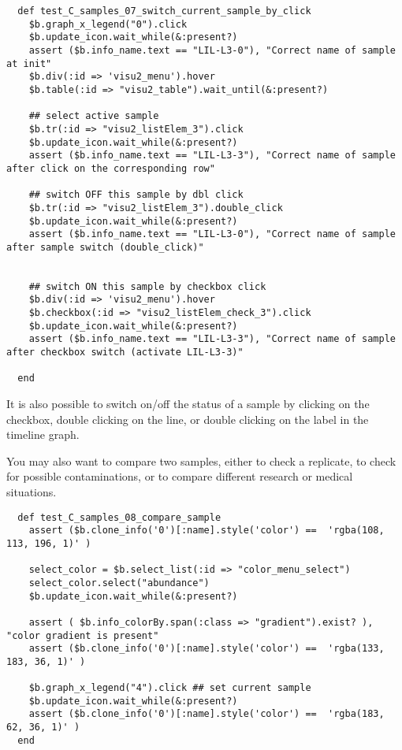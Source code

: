 \begin{verbatim}
  def test_C_samples_07_switch_current_sample_by_click
    $b.graph_x_legend("0").click
    $b.update_icon.wait_while(&:present?)
    assert ($b.info_name.text == "LIL-L3-0"), "Correct name of sample at init"
    $b.div(:id => 'visu2_menu').hover
    $b.table(:id => "visu2_table").wait_until(&:present?)

    ## select active sample
    $b.tr(:id => "visu2_listElem_3").click
    $b.update_icon.wait_while(&:present?)
    assert ($b.info_name.text == "LIL-L3-3"), "Correct name of sample after click on the corresponding row"

    ## switch OFF this sample by dbl click
    $b.tr(:id => "visu2_listElem_3").double_click
    $b.update_icon.wait_while(&:present?)
    assert ($b.info_name.text == "LIL-L3-0"), "Correct name of sample after sample switch (double_click)"
    

    ## switch ON this sample by checkbox click
    $b.div(:id => 'visu2_menu').hover
    $b.checkbox(:id => "visu2_listElem_check_3").click
    $b.update_icon.wait_while(&:present?)
    assert ($b.info_name.text == "LIL-L3-3"), "Correct name of sample after checkbox switch (activate LIL-L3-3)"
    
  end
\end{verbatim}
It is also possible to switch on/off the status of a sample by clicking on the checkbox, double clicking on the line, or double clicking on the label in the timeline graph.

\bigskip

You may also want to compare two samples, either to check a replicate, to check for possible contaminations, or to
compare different research or medical situations.

\begin{verbatim}
  def test_C_samples_08_compare_sample
    assert ($b.clone_info('0')[:name].style('color') ==  'rgba(108, 113, 196, 1)' )
    
    select_color = $b.select_list(:id => "color_menu_select")
    select_color.select("abundance")
    $b.update_icon.wait_while(&:present?)

    assert ( $b.info_colorBy.span(:class => "gradient").exist? ), "color gradient is present"
    assert ($b.clone_info('0')[:name].style('color') ==  'rgba(133, 183, 36, 1)' )

    $b.graph_x_legend("4").click ## set current sample
    $b.update_icon.wait_while(&:present?)
    assert ($b.clone_info('0')[:name].style('color') ==  'rgba(183, 62, 36, 1)' )
  end
\end{verbatim}

